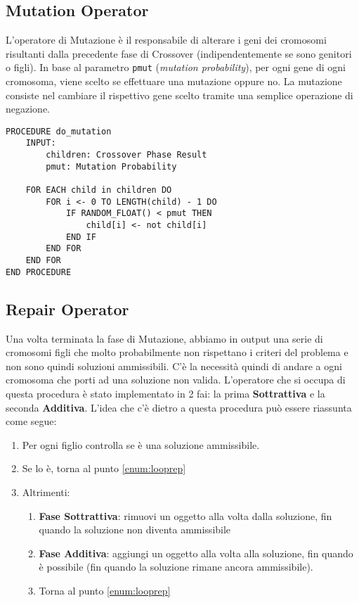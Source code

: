 \subsection{Mutation Operator}

L'operatore di Mutazione è il responsabile di alterare i geni dei cromosomi
risultanti dalla precedente fase di Crossover (indipendentemente se sono
genitori o figli). In base al parametro \verb|pmut| (\textit{mutation
    probability}), per ogni gene di ogni cromosoma, viene scelto se effettuare una
mutazione oppure no. La mutazione consiste nel cambiare il rispettivo gene
scelto tramite una semplice operazione di negazione.

\begin{minipage}{\textwidth}
    \begin{lstlisting}
PROCEDURE do_mutation
    INPUT:
        children: Crossover Phase Result
        pmut: Mutation Probability

    FOR EACH child in children DO
        FOR i <- 0 TO LENGTH(child) - 1 DO
            IF RANDOM_FLOAT() < pmut THEN
                child[i] <- not child[i]
            END IF
        END FOR
    END FOR
END PROCEDURE
\end{lstlisting}
\end{minipage}

\subsection{Repair Operator}

Una volta terminata la fase di Mutazione, abbiamo in output una serie di
cromosomi figli che molto probabilmente non rispettano i criteri del problema e
non sono quindi soluzioni ammissibili. C'è la necessità quindi di andare a
 ogni cromosoma che porti ad una soluzione non valida.
L'operatore che si occupa di questa procedura è stato implementato in 2 fai: la
prima \textbf{Sottrattiva} e la seconda \textbf{Additiva}. L'idea che c'è dietro
a questa procedura può essere riassunta come segue:

\begin{enumerate}
    \item Per ogni figlio controlla se è una soluzione ammissibile.
          \label{enum:looprep}
    \item Se lo è, torna al punto \ref{enum:looprep}
    \item Altrimenti:
          \begin{enumerate}
              \item \textbf{Fase Sottrattiva}: rimuovi un oggetto alla volta
                    dalla soluzione, fin quando la soluzione non diventa ammissibile
              \item \textbf{Fase Additiva}: aggiungi un oggetto alla volta alla
                    soluzione, fin quando è possibile (fin quando la soluzione
                    rimane ancora ammissibile).
              \item Torna al punto \ref{enum:looprep}
          \end{enumerate}
\end{enumerate}

